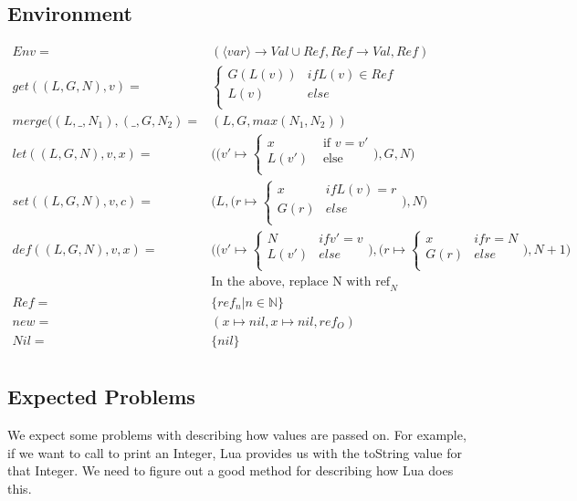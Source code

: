 \documentclass{article}
\begin{document}
\subsection{Environment}
$
\begin{array}{rl}
Env = & (\langle var \rangle \to Val \cup Ref, Ref \to Val, Ref) \\
get((L,G,N), v) =   & \begin{cases} G(L(v)) & if L(v)\in Ref \\
                    L(v) & else \\ \end{cases}\\
merge((L,\_,N_1),(\_,G,N_2) = & (L,G, max(N_1,N_2)) \\
let((L,G,N),v, x) =& \Big(\Big( v'\mapsto 
\begin{cases}
x & \text{ if } v=v'\\
L(v') & \text{ else} \\
\end{cases}\Big), G, N\Big)\\
set((L,G,N), v, c) =& \Big(L,\Big(r \mapsto 
\begin{cases}
x & if L(v) = r \\
G(r) & else \\
\end{cases}\Big),N\Big)\\
def((L,G,N),v,x) = & \Big(\Big(v' \mapsto 
\begin{cases}
N & if v'=v \\
L(v') & else \\
\end{cases} \Big),\Big( r\mapsto
\begin{cases}
x & if r=N\\
G(r) & else \\
\end{cases}\Big), N+1\Big) \\
 & \text{In the above, replace N with ref}_N\\
 Ref = & \{ref_n | n\in \mathbb{N}\} \\
 new = & ( x\mapsto nil, x\mapsto nil, ref_O) \\
 Nil = & \{nil\} \\
\end{array}
$

\subsection{Expected Problems}
We expect some problems with describing how values are passed on. For example, if we want to call to print an Integer, Lua provides us with the toString value for that Integer. We need to figure out a good method for describing how Lua does this. 
\end{document}
